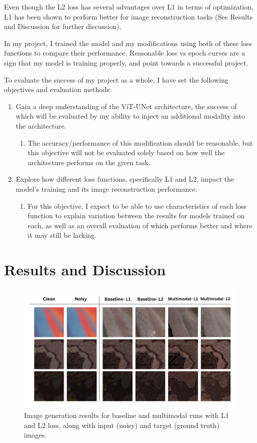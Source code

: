 \documentclass[10pt,twocolumn]{article}
\begin{document}
Even though the L2 loss has several advantages over L1 in terms of optimization, L1 has been shown to perform better for image reconstruction tasks \cite{lossblur} (See Results and Discussion for further discussion).

In my project, I trained the model and my modifications using both of these loss functions to compare their performance. Reasonable loss vs epoch curves are a sign that my model is training properly, and point towards a successful project.

To evaluate the success of my project as a whole, I have set the following objectives and evaluation methods: 

\begin{enumerate}
  \item Gain a deep understanding of the ViT-UNet architecture, the success of which will be evaluated by my ability to inject an additional modality into the architecture. 
  \begin{enumerate}
        \item The accuracy/performance of this modification should be reasonable, but this objective will not be evaluated solely based on how well the architecture performs on the given task.
  \end{enumerate}
  \item Explore how different loss functions, specifically L1 and L2, impact the model’s training and its image reconstruction performance. 
  \begin{enumerate}
      \item For this objective, I expect to be able to use characteristics of each loss function to explain variation between the results for models trained on each, as well as an overall evaluation of which performs better and where it may still be lacking. 
  \end{enumerate}
\end{enumerate}

\section{Results and Discussion}

\begin{figure}
  \includegraphics[width=\textwidth]{images/table.png}
  \caption{Image generation results for baseline and multimodal runs with L1 and L2 loss, along with input (noisy) and target (ground truth) images.}
  \label{fig:table}
\end{figure}
\end{document}
